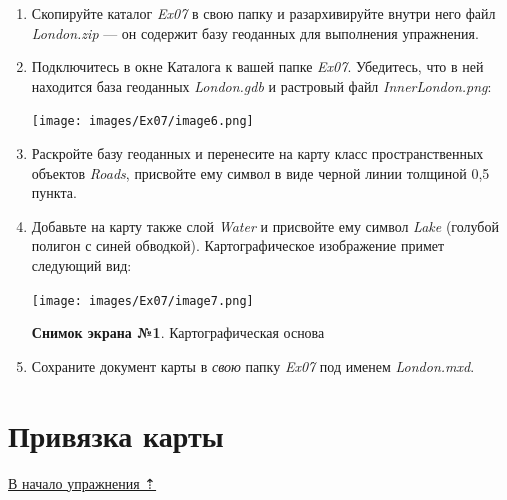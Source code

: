 \documentclass[12pt,]{book}
\begin{document}
\begin{enumerate}
\def\labelenumi{\arabic{enumi}.}
\item
  Скопируйте каталог \emph{Ex07} в свою папку и разархивируйте внутри него файл \emph{London.zip} --- он содержит базу геоданных для выполнения упражнения.
\item
  Подключитесь в окне Каталога к вашей папке \emph{Ex07}. Убедитесь, что в ней находится база геоданных \emph{London.gdb} и растровый файл \emph{InnerLondon.png}:

  \texttt{[image: images/Ex07/image6.png]}
\item
  Раскройте базу геоданных и перенесите на карту класс пространственных объектов \emph{Roads}, присвойте ему символ в виде черной линии толщиной 0,5 пункта.
\item
  Добавьте на карту также слой \emph{Water} и присвойте ему символ \emph{Lake} (голубой полигон с синей обводкой). Картографическое изображение примет следующий вид:

  \texttt{[image: images/Ex07/image7.png]}

  \textbf{Снимок экрана №1}. Картографическая основа
\item
  Сохраните документ карты в \emph{свою} папку \emph{Ex07} под именем \emph{London.mxd}.
\end{enumerate}

\hypertarget{map-ref-economic-referencing}{%
\section{Привязка карты}\label{map-ref-economic-referencing}}

\protect\hyperlink{map-ref-economic}{В начало упражнения ⇡}
\end{document}
